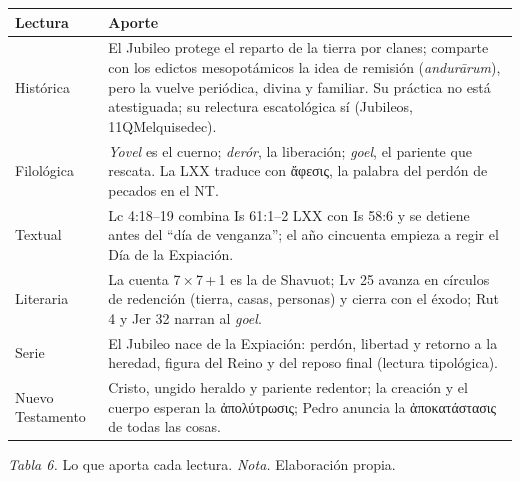 \documentclass[11pt,letterpaper]{article}
\newcommand{\grc}[1]{\foreignlanguage{ancientgreek}{#1}}
\newcommand{\pie}[1]{\par{\footnotesize\color{sepia}#1\par}}
\begin{document}
\begin{center}\begin{minipage}{\linewidth}\centering\small\renewcommand{\arraystretch}{1.2}
\begin{tabular}{@{}L{3.0cm}L{11.6cm}@{}}
\toprule
\textbf{Lectura} & \textbf{Aporte} \\ \midrule
Histórica & El Jubileo protege el reparto de la tierra por clanes; comparte con los edictos mesopotámicos la idea de remisión (\emph{andurārum}), pero la vuelve periódica, divina y familiar. Su práctica no está atestiguada; su relectura escatológica sí (Jubileos, 11QMelquisedec). \\
Filológica & \emph{Yovel} es el cuerno; \emph{derór}, la liberación; \emph{goel}, el pariente que rescata. La LXX traduce con \grc{ἄφεσις}, la palabra del perdón de pecados en el NT. \\
Textual & Lc 4:18--19 combina Is 61:1--2 LXX con Is 58:6 y se detiene antes del ``día de venganza''; el año cincuenta empieza a regir el Día de la Expiación. \\
Literaria & La cuenta 7\,×\,7\,+\,1 es la de Shavuot; Lv 25 avanza en círculos de redención (tierra, casas, personas) y cierra con el éxodo; Rut 4 y Jer 32 narran al \emph{goel}. \\
Serie & El Jubileo nace de la Expiación: perdón, libertad y retorno a la heredad, figura del Reino y del reposo final (lectura tipológica). \\
Nuevo Testamento & Cristo, ungido heraldo y pariente redentor; la creación y el cuerpo esperan la \grc{ἀπολύτρωσις}; Pedro anuncia la \grc{ἀποκατάστασις} de todas las cosas. \\
\bottomrule
\end{tabular}\par
\pie{\textit{Tabla 6.} Lo que aporta cada lectura. \textit{Nota.} Elaboración propia.}
\end{minipage}\end{center}

\end{document}
